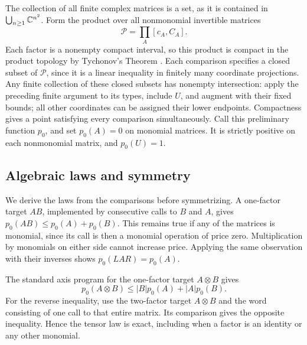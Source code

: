 The collection of all finite complex matrices is a set, as it is
contained in \(\bigcup_{n\geq1}\mathbb C^{n^2}\).  Form the product over
all nonmonomial invertible matrices
\[
 \mathcal P=\prod_A[c_A,C_A].
\]
Each factor is a nonempty compact interval, so this product is compact
in the product topology by Tychonov's Theorem
\citep[Tag~08ZU, Theorem~5.14.4]{stacksProject}.
Each comparison specifies a closed subset of \(\mathcal P\), since
it is a linear inequality in finitely many coordinate projections.
Any finite collection of these closed subsets has nonempty intersection:
apply the preceding finite argument to its types, include \(U\), and
augment with their fixed bounds; all other coordinates can be assigned
their lower endpoints.  Compactness gives a point satisfying every
comparison simultaneously.  Call this preliminary function \(p_0\),
and set \(p_0(A)=0\) on monomial matrices.  It is strictly positive
on each nonmonomial matrix, and \(p_0(U)=1\).

\subsection{Algebraic laws and symmetry}

We derive the laws from the comparisons before symmetrizing.  A
one-factor target \(AB\), implemented by consecutive calls to \(B\)
and \(A\), gives
\(p_0(AB)\leq p_0(A)+p_0(B)\).  This remains true if any of the
matrices is monomial, since its call is then a monomial operation of
price zero.  Multiplication by monomials on either side cannot increase
price.  Applying the same observation with their inverses shows
\(p_0(LAR)=p_0(A)\).

The standard axis program for the one-factor target \(A\otimes B\)
gives
\[
 p_0(A\otimes B)\leq |B|p_0(A)+|A|p_0(B).
\]
For the reverse inequality, use the two-factor target \(A\otimes B\)
and the word consisting of one call to that entire matrix.  Its
comparison gives the opposite inequality.  Hence the tensor law is
exact, including when a factor is an identity or any other monomial.

